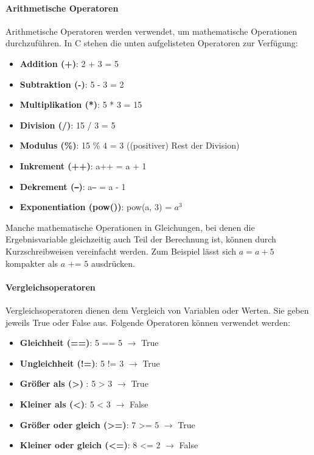 \documentclass[11pt, a4paper]{article}
\begin{document}
\paragraph{Arithmetische Operatoren}
Arithmetische Operatoren werden verwendet, um mathematische Operationen durchzuführen. In C stehen die unten aufgelisteten Operatoren zur Verfügung:
\begin{itemize}
	\item \textbf{Addition (+)}: 2 + 3 = 5
	\item \textbf{Subtraktion (-)}: 5 - 3 = 2
	\item \textbf{Multiplikation (*)}: 5 * 3 = 15
	\item \textbf{Division (/)}: 15 / 3 = 5
	\item \textbf{Modulus (\%)}: 15 \% 4 = 3 ((positiver) Rest der Division)
	\item \textbf{Inkrement (++)}: a++ = a + 1
	\item \textbf{Dekrement (\texttt{--})}: a\texttt{--} = a - 1
	\item \textbf{Exponentiation (pow())}: pow(a, 3) = $a^3$
\end{itemize}
Manche mathematische Operationen in Gleichungen, bei denen die Ergebnisvariable gleichzeitig auch Teil der Berechnung ist, können durch Kurzschreibweisen vereinfacht werden. Zum Beispiel lässt sich \(a = a + 5\) kompakter als \(a \text{ += } 5\) ausdrücken.

\paragraph{Vergleichsoperatoren}
Vergleichsoperatoren dienen dem Vergleich von Variablen oder Werten. Sie geben jeweils True oder False aus. Folgende Operatoren können verwendet werden:
\begin{itemize}
	\item \textbf{Gleichheit (==)}: 5 == 5 $\rightarrow$ True
	\item \textbf{Ungleichheit (!=)}: 5 != 3 $\rightarrow$ True
	\item \textbf{Größer als (>) }: 5 > 3 $\rightarrow$ True
	\item \textbf{Kleiner als (<)}: 5 < 3 $\rightarrow$ False
	\item \textbf{Größer oder gleich (>=)}: 7 >= 5 $\rightarrow$ True
	\item \textbf{Kleiner oder gleich (<=)}: 8 <= 2 $\rightarrow$ False
\end{itemize}
\end{document}
